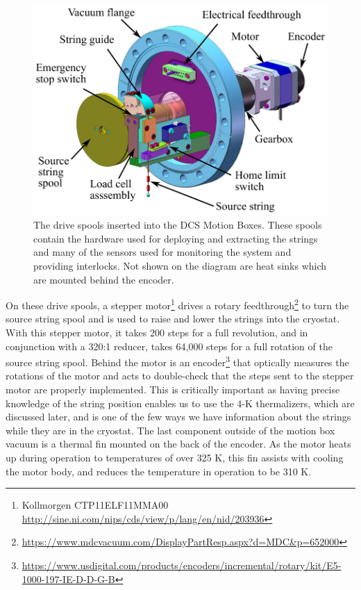 \begin{figure}
    \centering
    \includegraphics[width=0.8\linewidth]{Figures/drive_spool.pdf}
    \caption[The drive spools inserted into the DCS Motion Boxes]
    {The drive spools inserted into the DCS Motion Boxes.
    These spools contain the hardware used for deploying and extracting the strings and many of the sensors used for monitoring the system and providing interlocks.
    Not shown on the diagram are heat sinks which are mounted behind the encoder.}
    \label{fig:drive_spool}
\end{figure}
On these drive spools, a stepper motor\footnote{Kollmorgen CTP11ELF11MMA00 \url{http://sine.ni.com/nips/cds/view/p/lang/en/nid/203936}} drives a rotary feedthrough\footnote{\url{https://www.mdcvacuum.com/DisplayPartResp.aspx?d=MDC&p=652000}} to turn the source string spool and is used to raise and lower the strings into the cryostat.
With this stepper motor, it takes 200 steps for a full revolution, and in conjunction with a 320:1 reducer, takes 64,000 steps for a full rotation of the source string spool.
Behind the motor is an encoder\footnote{\RaggedRight\url{https://www.usdigital.com/products/encoders/incremental/rotary/kit/E5-1000-197-IE-D-D-G-B}} that optically measures the rotations of the motor and acts to double-check that the steps sent to the stepper motor are properly implemented.
This is critically important as having precise knowledge of the string position enables us to use the 4-K thermalizers, which are discussed later, and is one of the few ways we have information about the strings while they are in the cryostat.
The last component outside of the motion box vacuum is a thermal fin mounted on the back of the encoder.
As the motor heats up during operation to temperatures of over 325 K, this fin assists with cooling the motor body, and reduces the temperature in operation to be 310 K.
